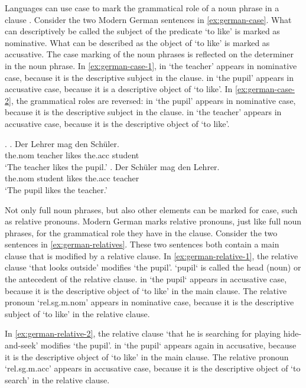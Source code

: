 Languages can use case to mark the grammatical role of a noun phrase in a clause \citep[cf.][]{moravcsik2009}. Consider the two Modern German sentences in \ref{ex:german-case}. What can descriptively be called the subject of the predicate  `to like' is marked as nominative. What can be described as the object of  `to like' is marked as accusative. The case marking of the noun phrases is reflected on the determiner in the noun phrase.
In \ref{ex:german-case-1},  in  `the teacher' appears in nominative case, because it is the descriptive subject in the clause.  in  `the pupil' appears in accusative case, because it is a descriptive object of  `to like'.
In \ref{ex:german-case-2}, the grammatical roles are reversed:  in  `the pupil' appears in nominative case, because it is the descriptive subject in the clause.  in  `the teacher' appears in accusative case, because it is the descriptive object of  `to like'.

\ex.\label{ex:german-case}
\ag. Der Lehrer mag den Schüler.\\
 the.\ac{nom} teacher likes the.\ac{acc} student\\
 `The teacher likes the pupil.'\label{ex:german-case-1}
\bg. Der Schüler mag den Lehrer.\\
 the.\ac{nom} student likes the.\ac{acc} teacher\\
 `The pupil likes the teacher.'\label{ex:german-case-2}

Not only full noun phrases, but also other elements can be marked for case, such as relative pronouns. Modern German marks relative pronouns, just like full noun phrases, for the grammatical role they have in the clause. Consider the two sentences in \ref{ex:german-relatives}. These two sentences both contain a main clause that is modified by a relative clause.
In \ref{ex:german-relative-1}, the relative clause  `that looks outside' modifies  `the pupil'.  `pupil` is called the head (noun) or the antecedent of the relative clause.  in  `the pupil` appears in accusative case, because it is the descriptive object of  `to like' in the main clause. The relative pronoun  `\ac{rel}.\ac{sg}.\ac{m}.\ac{nom}' appears in nominative case, because it is the descriptive subject of  `to like' in the relative clause.

In \ref{ex:german-relative-2}, the relative clause  `that he is searching for playing hide-and-seek' modifies  `the pupil'.  in  `the pupil` appears again in accusative, because it is the descriptive object of  `to like' in the main clause. The relative pronoun  `\ac{rel}.\ac{sg}.\ac{m}.\ac{acc}' appears in accusative case, because it is the descriptive object of  `to search' in the relative clause.

